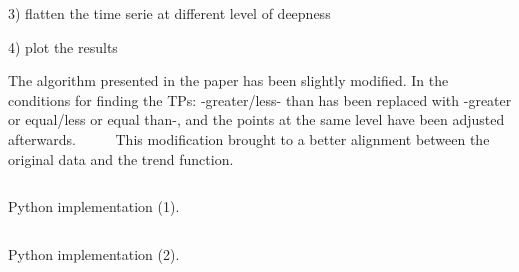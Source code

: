 \documentclass[a4paper]{article}
\begin{document}
3) flatten the time serie at different level of deepness

4) plot the results 

The algorithm presented in the paper has been slightly modified. In the conditions for finding the TPs: -greater/less- than has been replaced with -greater or equal/less or equal than-, and the points at the same level have been adjusted afterwards.     
This modification brought to a better alignment between the original data and the trend function.


\begin{listing}%
 
\inputminted[firstline = 2, lastline = 47]{python}{../code/TPs_Python.py}

\caption{Python implementation (1).}\label{lst:python}

\end{listing}
 
 
\begin{listing}%
 
\inputminted[firstline = 50, lastline = 90, breaklines = true]{python}{../code/TPs_Python.py}

\caption{Python implementation (2).}\label{lst:python2}

\end{listing}
 
\end{document}
